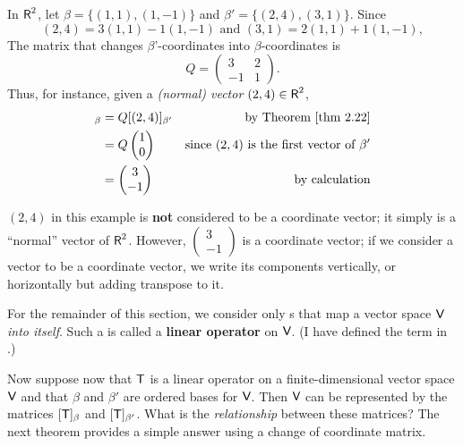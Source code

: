 \begin{example} \label{example 2.5.1}
In \(\textsf{R}^2\), let \(\beta = \{ (1, 1), (1, -1) \}\) and \(\beta' = \{ (2, 4), (3, 1) \}\).
Since
\[
    (2, 4) = 3(1, 1) - 1(1, - 1) \text{ and } (3, 1) = 2(1, 1) + 1(1, -1),
\]
The matrix that changes \(\beta\)'-coordinates into \(\beta\)-coordinates is
\[
    Q = \begin{pmatrix} 3 & 2 \\ -1 & 1 \end{pmatrix}.
\]
Thus, for instance, given a \emph{(normal) vector} \((2, 4) \in \textsf{R}^2\),
\begin{align*}
    [(2, 4)]_{\beta} & = Q[(2, 4)]_{\beta'} & \text{by \THM{2.22}} \\
                     & = Q \begin{pmatrix} 1 \\ 0 \end{pmatrix} & \text{since \((2, 4)\) is the first vector of \(\beta'\)} \\
                     & = \begin{pmatrix} 3 \\ -1 \end{pmatrix} & \text{by calculation}
\end{align*}
\end{example}

\begin{note}
\((2, 4)\) in this example is \textbf{not} considered to be a coordinate vector; it simply is a ``normal'' vector of \(\textsf{R}^2\).
However, \(\begin{pmatrix} 3 \\ -1 \end{pmatrix}\) is a coordinate vector;
if we consider a vector to be a coordinate vector, we write its components vertically, or horizontally but adding transpose to it.
\end{note}

For the remainder of this section, we consider only \LTRAN{}s that map a vector space \(\textsf{V}\) \emph{into itself}.
Such a \LTRAN{} is called a \textbf{linear operator} on \(\textsf{V}\).
(I have defined the term in .)

Now suppose now that \(\textsf{T}\) is a linear operator on a finite-dimensional vector space \(\textsf{V}\) and that \(\beta\) and \(\beta'\) are ordered bases for \(\textsf{V}\).
Then \(\textsf{V}\) can be represented by the matrices \([\textsf{T}]_{\beta}\) and \([\textsf{T}]_{\beta'}\).
What is the \emph{relationship} between these matrices?
The next theorem provides a simple answer using a
change of coordinate matrix.

